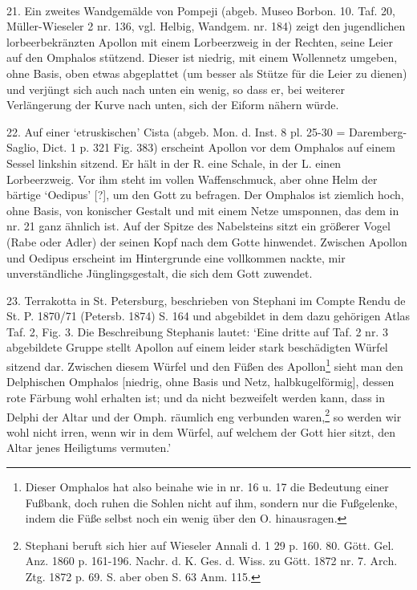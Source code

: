 \documentclass[a4paper, 11pt, oneside]{article}
\begin{document}
\paragraph{}
21. Ein zweites Wandgemälde von Pompeji (abgeb. Museo Borbon. 10. Taf. 20, Müller-Wieseler 2 nr. 136, vgl. Helbig, Wandgem. nr. 184) zeigt den jugendlichen lorbeerbekränzten Apollon mit einem Lorbeerzweig in der Rechten, seine Leier auf den Omphalos stützend. Dieser ist niedrig, mit einem Wollennetz umgeben, ohne Basis, oben etwas abgeplattet (um besser als Stütze für die Leier zu dienen) und verjüngt sich auch nach unten ein wenig, so dass er, bei weiterer Verlängerung der Kurve nach unten, sich der Eiform nähern würde.

22. Auf einer `etruskischen' Cista (abgeb. Mon. d. Inst. 8 pl. 25-30 = Daremberg-Saglio, Dict. 1 p. 321 Fig. 383) erscheint Apollon vor dem Omphalos auf einem Sessel linkshin sitzend. Er hält in der R. eine Schale, in der L. einen Lorbeerzweig. Vor ihm steht im vollen Waffenschmuck, aber ohne Helm der bärtige `Oedipus' [?], um den Gott zu befragen. Der Omphalos ist ziemlich hoch, ohne Basis, von konischer Gestalt und mit einem Netze umsponnen, das dem in nr. 21 ganz ähnlich ist. Auf der Spitze des Nabelsteins sitzt ein größerer Vogel (Rabe oder Adler) der seinen Kopf nach dem Gotte hinwendet. Zwischen Apollon und Oedipus erscheint im Hintergrunde eine vollkommen nackte, mir unverständliche Jünglingsgestalt, die sich dem Gott zuwendet.

23. Terrakotta in St. Petersburg, beschrieben von Stephani im Compte Rendu de St. P. 1870/71 (Petersb. 1874) S. 164 und abgebildet in dem dazu gehörigen Atlas Taf. 2, Fig. 3. Die Beschreibung Stephanis lautet: `Eine dritte auf Taf. 2 nr. 3 abgebildete Gruppe stellt Apollon auf einem leider stark beschädigten Würfel sitzend dar. Zwischen diesem Würfel und den Füßen des Apollon\footnote{Dieser Omphalos hat also beinahe wie in nr. 16 u. 17 die Bedeutung einer Fußbank, doch ruhen die Sohlen nicht auf ihm, sondern nur die Fußgelenke, indem die Füße selbst noch ein wenig über den O. hinausragen.} sieht man den Delphischen Omphalos [niedrig, ohne Basis und Netz, halbkugelförmig], dessen rote Färbung wohl erhalten ist; und da nicht bezweifelt werden kann, dass in Delphi der Altar und der Omph. räumlich eng verbunden waren,\footnote{Stephani beruft sich hier auf Wieseler Annali d. 1 29 p. 160. 80. Gött. Gel. Anz. 1860 p. 161-196. Nachr. d. K. Ges. d. Wiss. zu Gött. 1872 nr. 7. Arch. Ztg. 1872 p. 69. S. aber oben S. 63 Anm. 115.} so werden wir wohl nicht irren, wenn wir in dem Würfel, auf welchem der Gott hier sitzt, den Altar jenes Heiligtums vermuten.'
\end{document}
